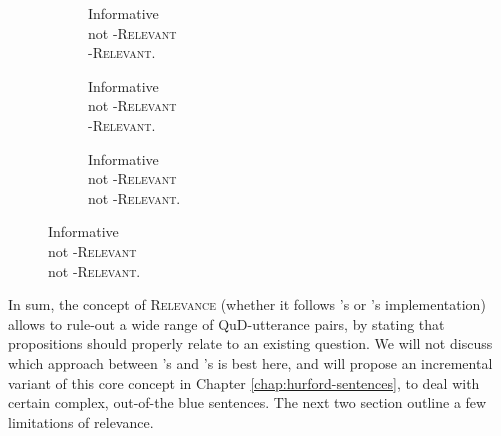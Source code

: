 \begin{figure}[H]\ContinuedFloat
	\begin{subfigure}[b]{.3\linewidth}
		\centering
		\caption{Informative\\not \textsc{\citeauthor{Lewis1988}-Relevant}\\ \textsc{\citeauthor{Roberts2012}-Relevant}.}\label{fig1:sub-cell-relevant}
	\end{subfigure}\hfill
	\begin{subfigure}[b]{.3\linewidth}
		\centering
		\caption{Informative\\not \textsc{\citeauthor{Lewis1988}-Relevant}\\ \textsc{\citeauthor{Roberts2012}-Relevant}.}\label{fig1:sub-1-cell-relevant}
	\end{subfigure}\hfill
	\begin{subfigure}[b]{.33\linewidth}
		\centering
		\caption{Informative\\not \textsc{\citeauthor{Lewis1988}-Relevant}\\not \textsc{\citeauthor{Roberts2012}-Relevant}.}\label{fig1:not-relevant}
	\end{subfigure}
\end{figure}

In sum, the concept of \textsc{Relevance} (whether it follows \citeauthor{Lewis1988}'s or \citeauthor{Roberts2012}'s implementation) allows to rule-out a wide range of QuD-utterance pairs, by stating that propositions should properly relate to an existing question. We will not discuss which approach between \citeauthor{Lewis1988}'s and \citeauthor{Roberts2012}'s is best here, and will propose an incremental variant of this core concept in Chapter \ref{chap:hurford-sentences}, to deal with certain complex, out-of-the blue sentences. The next two section outline a few limitations of relevance.

